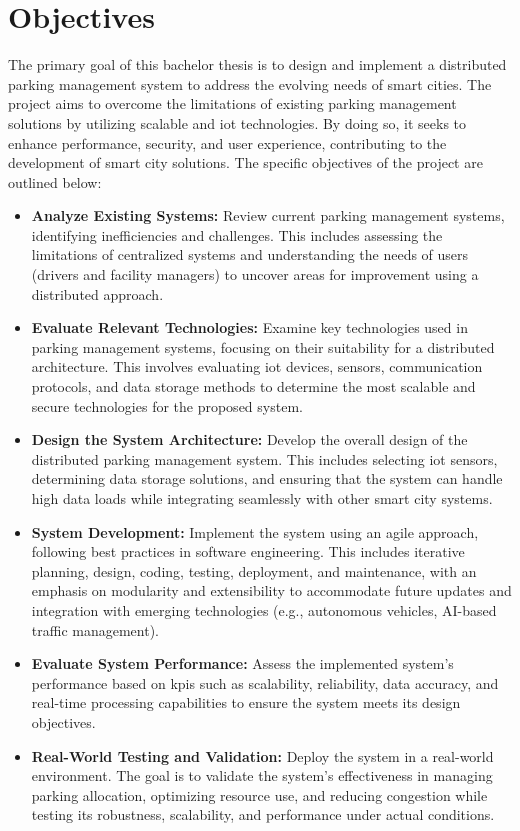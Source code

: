 
\chapter{Objectives}\label{ch:objectives}

The primary goal of this bachelor thesis is to design and implement a distributed parking management system to address the evolving needs of smart cities. The project aims to overcome the limitations of existing parking management solutions by utilizing scalable and \gls{iot} technologies. By doing so, it seeks to enhance performance, security, and user experience, contributing to the development of smart city solutions. The specific objectives of the project are outlined below:

\begin{itemize}
	\item \textbf{Analyze Existing Systems:} Review current parking management systems, identifying inefficiencies and challenges. This includes assessing the limitations of centralized systems and understanding the needs of users (drivers and facility managers) to uncover areas for improvement using a distributed approach.

	\item \textbf{Evaluate Relevant Technologies:} Examine key technologies used in parking management systems, focusing on their suitability for a distributed architecture. This involves evaluating \gls{iot} devices, sensors, communication protocols, and data storage methods to determine the most scalable and secure technologies for the proposed system.

	\item \textbf{Design the System Architecture:} Develop the overall design of the distributed parking management system. This includes selecting \gls{iot} sensors, determining data storage solutions, and ensuring that the system can handle high data loads while integrating seamlessly with other smart city systems.

	\item \textbf{System Development:} Implement the system using an agile approach, following best practices in software engineering. This includes iterative planning, design, coding, testing, deployment, and maintenance, with an emphasis on modularity and extensibility to accommodate future updates and integration with emerging technologies (e.g., autonomous vehicles, AI-based traffic management).

	\item \textbf{Evaluate System Performance:} Assess the implemented system's performance based on \glspl{kpi} such as scalability, reliability, data accuracy, and real-time processing capabilities to ensure the system meets its design objectives.

	\item \textbf{Real-World Testing and Validation:} Deploy the system in a real-world environment. The goal is to validate the system’s effectiveness in managing parking allocation, optimizing resource use, and reducing congestion while testing its robustness, scalability, and performance under actual conditions.

\end{itemize}

